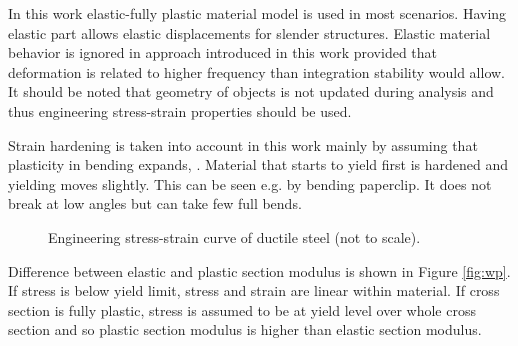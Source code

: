 In this work elastic-fully plastic material model is used in most scenarios.
Having elastic part allows elastic displacements for slender structures. 
Elastic material behavior is ignored in approach introduced in this work provided
that deformation is related to higher frequency
than integration stability would allow.
It should be noted that geometry
of objects is not updated during analysis and thus engineering stress-strain properties should
be used.

Strain hardening is taken into account in this work mainly by assuming that plasticity in bending
expands, \citet[p.~672]{dowling}.
Material that starts to yield first is hardened and yielding moves slightly.
This can be seen e.g. by bending paperclip. It does not break at low angles but can take few full bends. 

\begin{figure}[htb!]
\centering
{}
\caption{Engineering stress-strain curve of ductile steel (not to scale).}
\label{fig:sscurve}
\end{figure}

Difference between elastic and plastic section modulus is shown in Figure \ref{fig:wp}.
If stress is below yield limit, stress and strain are linear within material.
If cross section is fully plastic, stress is assumed to be at yield level over whole cross section and 
so plastic section modulus is higher than elastic section modulus.


